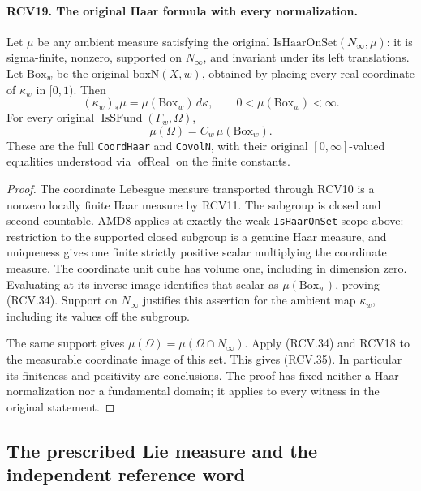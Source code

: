 \paragraph{RCV19. The original Haar formula with every normalization.}
\label{claim:RCV19}
Let \(\mu\) be any ambient measure satisfying the original
\(\mathrm{IsHaarOnSet}(N_\infty,\mu)\): it is sigma-finite,
nonzero, supported on \(N_\infty\), and invariant under its
left translations.  Let \(\mathrm{Box}_w\) be the original
\(\mathrm{boxN}(X,w)\), obtained by placing every real coordinate
of \(\kappa_w\) in \([0,1)\).  Then
\[
 (\kappa_w)_*\mu=\mu(\mathrm{Box}_w)\,d\kappa,
 \qquad 0<\mu(\mathrm{Box}_w)<\infty.
\tag{RCV.34}
\]
For every original \(\operatorname{IsSFund}(\Gamma_w,\Omega)\),
\[
                 \mu(\Omega)=C_w\,\mu(\mathrm{Box}_w).
\tag{RCV.35}
\]
These are the full \texttt{CoordHaar} and \texttt{CovolN},
with their original \([0,\infty]\)-valued equalities understood
via \(\operatorname{ofReal}\) on the finite constants.
\begin{proof}
The coordinate Lebesgue measure transported through RCV10 is a
nonzero locally finite Haar measure by RCV11.  The subgroup is
closed and second countable.  AMD8 applies at exactly the weak
\texttt{IsHaarOnSet} scope above: restriction to the supported
closed subgroup is a genuine Haar measure, and uniqueness gives
one finite strictly positive scalar multiplying the coordinate
measure.  The coordinate unit cube has volume one, including
in dimension zero.  Evaluating at its inverse image identifies
that scalar as \(\mu(\mathrm{Box}_w)\), proving (RCV.34).
Support on \(N_\infty\) justifies this assertion for the ambient
map \(\kappa_w\), including its values off the subgroup.

The same support gives \(\mu(\Omega)=\mu(\Omega\cap N_\infty)\).
Apply (RCV.34) and RCV18 to the measurable coordinate image of
this set.  This gives (RCV.35).  In particular its finiteness and
positivity are conclusions.  The proof has fixed neither a Haar
normalization nor a fundamental domain; it applies to every
witness in the original statement.
\end{proof}

\subsection{The prescribed Lie measure and the independent reference word}

